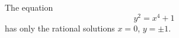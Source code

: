 \begin{proposition}
    The equation
\[
    y^2=x^4+1
\]
    has only the rational solutions $x=0$, $y=\pm1$.
\end{proposition}
